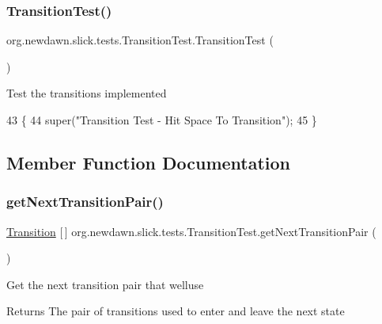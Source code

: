 \subsubsection{\texorpdfstring{Transition\+Test()}{TransitionTest()}}
{\footnotesize\ttfamily org.\+newdawn.\+slick.\+tests.\+Transition\+Test.\+Transition\+Test (\begin{DoxyParamCaption}{ }\end{DoxyParamCaption})\hspace{0.3cm}{\ttfamily [inline]}}

Test the transitions implemented 
\begin{DoxyCode}
43                             \{
44         super(\textcolor{stringliteral}{"Transition Test - Hit Space To Transition"});
45     \}
\end{DoxyCode}


\subsection{Member Function Documentation}
\mbox{\label{classorg_1_1newdawn_1_1slick_1_1tests_1_1_transition_test_a58d5d7172cabffd0d18457cbf8a90e6b}} 
\subsubsection{\texorpdfstring{get\+Next\+Transition\+Pair()}{getNextTransitionPair()}}
{\footnotesize\ttfamily \mbox{\hyperlink{interfaceorg_1_1newdawn_1_1slick_1_1state_1_1transition_1_1_transition}{Transition}} \mbox{[}$\,$\mbox{]} org.\+newdawn.\+slick.\+tests.\+Transition\+Test.\+get\+Next\+Transition\+Pair (\begin{DoxyParamCaption}{ }\end{DoxyParamCaption})\hspace{0.3cm}{\ttfamily [inline]}}

Get the next transition pair that we\textquotesingle{}lluse

\begin{DoxyReturn}{Returns}
The pair of transitions used to enter and leave the next state 
\end{DoxyReturn}

